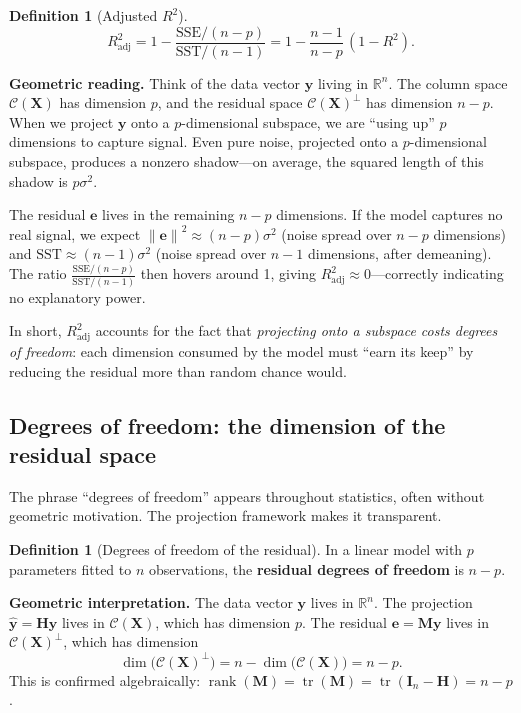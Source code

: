 \documentclass[11pt,a4paper]{article}
\theoremstyle{plain}
\theoremstyle{definition}
\newtheorem{definition}[theorem]{Definition}
\newcommand{\R}{\mathbb{R}}
\newcommand{\yhat}{\hat{\bm{y}}}
\newcommand{\bX}{\bm{X}}
\newcommand{\by}{\bm{y}}
\newcommand{\be}{\bm{e}}
\newcommand{\bH}{\bm{H}}
\newcommand{\bM}{\bm{M}}
\newcommand{\bI}{\bm{I}}
\newcommand{\Col}{\mathcal{C}}
\newcommand{\norm}[1]{\left\lVert #1 \right\rVert}
\DeclareMathOperator{\tr}{tr}
\DeclareMathOperator{\rank}{rank}
\begin{document}
\begin{definition}[Adjusted $R^2$]
\[
  R^2_{\text{adj}}
  = 1 - \frac{\text{SSE}/(n-p)}{\text{SST}/(n-1)}
  = 1 - \frac{n-1}{n-p}\,(1-R^2).
\]
\end{definition}

\noindent\textbf{Geometric reading.}
Think of the data vector $\by$ living in $\R^n$.
The column space $\Col(\bX)$ has dimension $p$, and the residual space
$\Col(\bX)^\perp$ has dimension $n - p$.
When we project $\by$ onto a $p$-dimensional subspace, we are ``using up''
$p$ dimensions to capture signal.  Even pure noise, projected onto a
$p$-dimensional subspace, produces a nonzero shadow---on average, the
squared length of this shadow is $p\sigma^2$.

The residual $\be$ lives in the remaining $n-p$ dimensions.
If the model captures no real signal, we expect
$\norm{\be}^2 \approx (n-p)\sigma^2$ (noise spread over $n-p$ dimensions)
and $\text{SST} \approx (n-1)\sigma^2$ (noise spread over $n-1$ dimensions,
after demeaning).
The ratio $\frac{\text{SSE}/(n-p)}{\text{SST}/(n-1)}$ then hovers around 1,
giving $R^2_{\text{adj}} \approx 0$---correctly indicating no explanatory power.

In short, $R^2_{\text{adj}}$ accounts for the fact that \emph{projecting onto
a subspace costs degrees of freedom}: each dimension consumed by the model
must ``earn its keep'' by reducing the residual more than random chance would.

\subsection{Degrees of freedom: the dimension of the residual space}\label{sec:df}

The phrase ``degrees of freedom'' appears throughout statistics, often without
geometric motivation.  The projection framework makes it transparent.

\begin{definition}[Degrees of freedom of the residual]
In a linear model with $p$ parameters fitted to $n$ observations, the
\textbf{residual degrees of freedom} is $n - p$.
\end{definition}

\noindent\textbf{Geometric interpretation.}
The data vector $\by$ lives in $\R^n$.
The projection $\yhat = \bH\by$ lives in $\Col(\bX)$, which has dimension $p$.
The residual $\be = \bM\by$ lives in $\Col(\bX)^\perp$, which has dimension
\[
  \dim\bigl(\Col(\bX)^\perp\bigr) = n - \dim\bigl(\Col(\bX)\bigr) = n - p.
\]
This is confirmed algebraically: $\rank(\bM) = \tr(\bM) = \tr(\bI_n - \bH) = n - p$.
\end{document}
